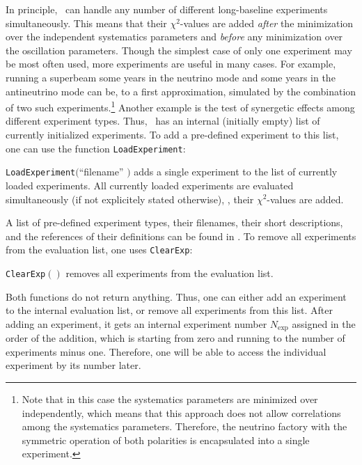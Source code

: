 In principle, \GLOBES\ can handle any number of different long-baseline experiments simultaneously. This means that their $\chi^2$-values are added {\em after} the minimization over the independent systematics parameters and {\em before} any minimization over the oscillation parameters. Though the simplest case of only one experiment may be most often used, more experiments are useful in many cases. For example, running a superbeam some years in the neutrino mode and some years in the antineutrino mode can be, to a first approximation, simulated by the combination of two such experiments.\footnote{Note that in this case the systematics parameters are minimized over independently, which means that this approach does not allow correlations among the systematics parameters. Therefore, the neutrino factory with the symmetric operation of both polarities is encapsulated into a single experiment.} Another example is the test of synergetic effects among different experiment types. Thus, \GLOBES\ has an internal (initially empty) list of currently initialized experiments. To add a pre-defined experiment to this list, one can use the function {\tt LoadExperiment}:
\begin{function}
{\tt LoadExperiment}$($``filename'' $)$ adds a single experiment to the list of currently loaded experiments. All currently loaded experiments are evaluated simultaneously (if not explicitely stated otherwise), \ie , their $\chi^2$-values are added.
\end{function}
A list of pre-defined experiment types, their filenames, their short descriptions, and the references of their definitions can be found in . To remove all experiments from the evaluation list, one uses {\tt ClearExp}:
\begin{function}
{\tt ClearExp}$()$ removes all experiments from the evaluation list.   
\end{function}
Both functions do not return anything. Thus, one can either add an experiment to the internal evaluation list, or remove all experiments from this list. After adding an experiment, it gets an internal experiment number $N_{\mathrm{exp}}$ assigned in the order of the addition, which is starting from zero and running to the number of experiments minus one. Therefore, one will be able to access the individual experiment by its number later.

